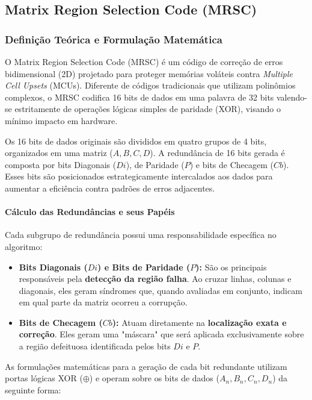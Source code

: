 \documentclass[12pt,a4paper]{article}
\begin{document}
\subsection{Matrix Region Selection Code (MRSC)}

\subsubsection{Definição Teórica e Formulação Matemática}

O Matrix Region Selection Code (MRSC) é um código de correção de erros bidimensional (2D) projetado para proteger memórias voláteis contra \textit{Multiple Cell Upsets} (MCUs). Diferente de códigos tradicionais que utilizam polinômios complexos, o MRSC codifica 16 bits de dados em uma palavra de 32 bits valendo-se estritamente de operações lógicas simples de paridade (XOR), visando o mínimo impacto em hardware.

Os 16 bits de dados originais são divididos em quatro grupos de 4 bits, organizados em uma matriz ($A, B, C, D$). A redundância de 16 bits gerada é composta por bits Diagonais ($Di$), de Paridade ($P$) e bits de Checagem ($Cb$). Esses bits são posicionados estrategicamente intercalados aos dados para aumentar a eficiência contra padrões de erros adjacentes.

\paragraph{Cálculo das Redundâncias e seus Papéis}

Cada subgrupo de redundância possui uma responsabilidade específica no algoritmo:

\begin{itemize}
    \item \textbf{Bits Diagonais ($Di$) e Bits de Paridade ($P$):} São os principais responsáveis pela \textbf{detecção da região falha}. Ao cruzar linhas, colunas e diagonais, eles geram síndromes que, quando avaliadas em conjunto, indicam em qual parte da matriz ocorreu a corrupção.
    \item \textbf{Bits de Checagem ($Cb$):} Atuam diretamente na \textbf{localização exata e correção}. Eles geram uma "máscara" que será aplicada exclusivamente sobre a região defeituosa identificada pelos bits $Di$ e $P$.
\end{itemize}

As formulações matemáticas para a geração de cada bit redundante utilizam portas lógicas XOR ($\oplus$) e operam sobre os bits de dados ($A_n, B_n, C_n, D_n$) da seguinte forma:
\end{document}
